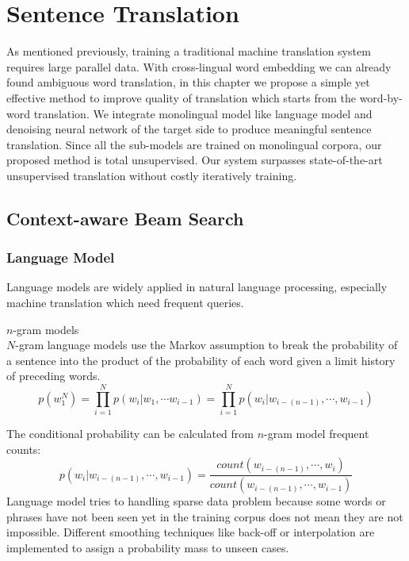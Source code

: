 \chapter{Sentence Translation}
As mentioned previously, training a traditional machine translation system requires large parallel data. With cross-lingual word embedding we can already found ambiguous word translation, in this chapter we propose a simple yet effective method to improve quality of translation which starts from the word-by-word translation. We integrate monolingual model like language model and denoising neural network of the target side to produce meaningful sentence translation. Since all the sub-models  are trained on monolingual corpora, our proposed method is total unsupervised. Our system surpasses state-of-the-art unsupervised translation without costly iteratively training.  
\section{Context-aware Beam Search}
	\subsection{Language Model}
		Language models are widely applied in natural language processing, especially machine translation which need frequent queries. 
		
		${n}$-gram models\\
		${N}$-gram language models use the Markov assumption to break the probability of a sentence into the product of the probability of each word given a limit history of preceding words.
		\[ p(w_1^N) = \prod_{i=1}^{N} p(w_i| w_1, \cdots	w_{i-1}) = \prod_{i=1}^N {p(w_i | w_{i-(n-1)}, \cdots , w_{i-1})}  \] 
		
		The conditional probability can be calculated from ${n}$-gram model frequent counts:
		\[p(w_i | w_{i-(n-1)}, \cdots , w_{i-1}) = \frac{count(w_{i-(n-1)}, \cdots, w_i)}{count(w_{i-(n-1)}, \cdots, w_{i-1})} \]
		Language model tries to handling sparse data problem because some words or phrases have not been seen yet in the training corpus does not mean they are not impossible. Different smoothing techniques like back-off or interpolation are implemented to assign a probability mass to unseen cases.
